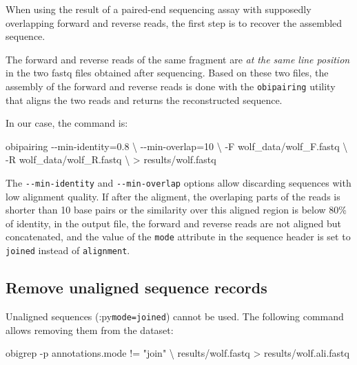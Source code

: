 \documentclass[
  letterpaper,
  DIV=11,
  numbers=noendperiod]{scrreprt}
\newenvironment{Shaded}{\begin{snugshade}}{\end{snugshade}}
\newcommand{\AttributeTok}[1]{\textcolor[rgb]{0.40,0.45,0.13}{#1}}
\newcommand{\DataTypeTok}[1]{\textcolor[rgb]{0.68,0.00,0.00}{#1}}
\newcommand{\ExtensionTok}[1]{\textcolor[rgb]{0.00,0.23,0.31}{#1}}
\newcommand{\NormalTok}[1]{\textcolor[rgb]{0.00,0.23,0.31}{#1}}
\newcommand{\OperatorTok}[1]{\textcolor[rgb]{0.37,0.37,0.37}{#1}}
\newcommand{\StringTok}[1]{\textcolor[rgb]{0.13,0.47,0.30}{#1}}
\begin{document}
When using the result of a paired-end sequencing assay with supposedly
overlapping forward and reverse reads, the first step is to recover the
assembled sequence.

The forward and reverse reads of the same fragment are \emph{at the same
line position} in the two fastq files obtained after sequencing. Based
on these two files, the assembly of the forward and reverse reads is
done with the \texttt{obipairing} utility that aligns the two reads and
returns the reconstructed sequence.

In our case, the command is:

\begin{Shaded}
\begin{Highlighting}[]
\ExtensionTok{obipairing} \AttributeTok{{-}{-}min{-}identity}\OperatorTok{=}\NormalTok{0.8 }\DataTypeTok{\textbackslash{}}
           \AttributeTok{{-}{-}min{-}overlap}\OperatorTok{=}\NormalTok{10 }\DataTypeTok{\textbackslash{}}
           \AttributeTok{{-}F}\NormalTok{ wolf\_data/wolf\_F.fastq }\DataTypeTok{\textbackslash{}}
           \AttributeTok{{-}R}\NormalTok{ wolf\_data/wolf\_R.fastq }\DataTypeTok{\textbackslash{}}
           \OperatorTok{\textgreater{}}\NormalTok{ results/wolf.fastq }
\end{Highlighting}
\end{Shaded}

The \texttt{-\/-min-identity} and \texttt{-\/-min-overlap} options allow
discarding sequences with low alignment quality. If after the aligment,
the overlaping parts of the reads is shorter than 10 base pairs or the
similarity over this aligned region is below 80\% of identity, in the
output file, the forward and reverse reads are not aligned but
concatenated, and the value of the \texttt{mode} attribute in the
sequence header is set to \texttt{joined} instead of \texttt{alignment}.

\hypertarget{remove-unaligned-sequence-records}{%
\subsection{Remove unaligned sequence
records}\label{remove-unaligned-sequence-records}}

Unaligned sequences (:py\texttt{mode=joined}) cannot be used. The
following command allows removing them from the dataset:

\begin{Shaded}
\begin{Highlighting}[]
\ExtensionTok{obigrep} \AttributeTok{{-}p} \StringTok{\textquotesingle{}annotations.mode != "join"\textquotesingle{}} \DataTypeTok{\textbackslash{}}
\NormalTok{        results/wolf.fastq }\OperatorTok{\textgreater{}}\NormalTok{ results/wolf.ali.fastq}
\end{Highlighting}
\end{Shaded}
\end{document}

